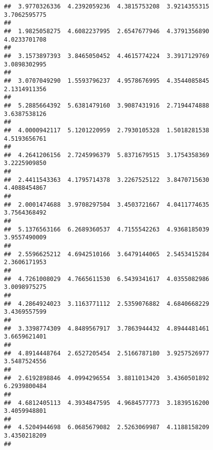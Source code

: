 \documentclass[]{article}
\begin{document}
\begin{verbatim}
##  3.9770326336  4.2392059236  4.3815753208  3.9214355315  3.7062595775 
##                                                                       
##  1.9825058275  4.6082237995  2.6547677946  4.3791356890  4.0233701708 
##                                                                       
##  3.1573897393  3.8465050452  4.4615774224  3.3917129769  3.0898302995 
##                                                                       
##  3.0707049290  1.5593796237  4.9578676995  4.3544085845  2.1314911356 
##                                                                       
##  5.2885664392  5.6381479160  3.9087431916  2.7194474888  3.6387538126 
##                                                                       
##  4.0000942117  5.1201220959  2.7930105328  1.5018281538  4.5193656761 
##                                                                       
##  4.2641206156  2.7245996379  5.8371679515  3.1754358369  3.2225909850 
##                                                                       
##  2.4411543363  4.1795714378  3.2267525122  3.8470715630  4.4088454867 
##                                                                       
##  2.0001474688  3.9708297504  3.4503721667  4.0411774635  3.7564368492 
##                                                                       
##  5.1376563166  6.2689360537  4.7155542263  4.9368185039  3.9557490009 
##                                                                       
##  2.5596625212  4.6942510166  3.6479144065  2.5453415284  2.3606171953 
##                                                                       
##  4.7261008029  4.7665611530  6.5439341617  4.0355082986  3.0098975275 
##                                                                       
##  4.2864924023  3.1163771112  2.5359076882  4.6840668229  3.4369557599 
##                                                                       
##  3.3398774309  4.8489567917  3.7863944432  4.8944481461  3.6659621401 
##                                                                       
##  4.8914448764  2.6527205454  2.5166787180  3.9257526977  3.5487524556 
##                                                                       
##  2.6192898846  4.0994296554  3.8811013420  3.4360501892  6.2939800484 
##                                                                       
##  4.6812405113  4.3934847595  4.9684577773  3.1839516200  3.4059948801 
##                                                                       
##  4.5204944698  6.0685679082  2.5263069987  4.1188158209  3.4350218209 
##                                                                       

\end{verbatim}
\end{document}
